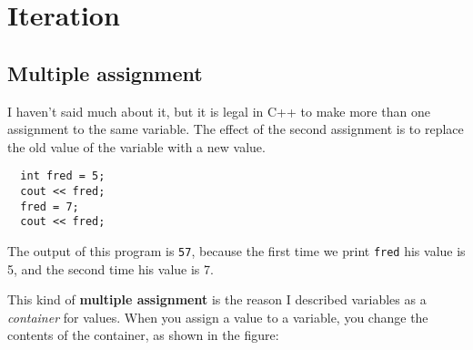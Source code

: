 





\chapter{Iteration}

\section{Multiple assignment}

I haven't said much about it, but it is legal in C++ to
make more than one assignment to the same variable.  The
effect of the second assignment is to replace the old value
of the variable with a new value.

\begin{lstlisting}
  int fred = 5;
  cout << fred;
  fred = 7;
  cout << fred;
\end{lstlisting}
%
The output of this program is {\tt 57}, because the first
time we print {\tt fred} his value is 5, and the second time
his value is 7.

This kind of {\bf multiple assignment} is the reason I
described variables as a {\em container} for values.  When
you assign a value to a variable, you change the contents of
the container, as shown in the figure:

